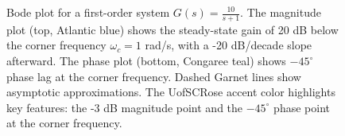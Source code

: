 \begin{figure}[htbp]

\caption{Bode plot for a first-order system $G(s) = \frac{10}{s+1}$. The magnitude plot (top, Atlantic blue) shows the steady-state gain of 20 dB below the corner frequency $\omega_c = 1$ rad/s, with a -20 dB/decade slope afterward. The phase plot (bottom, Congaree teal) shows $-45^{\circ}$ phase lag at the corner frequency. Dashed Garnet lines show asymptotic approximations. The UofSCRose accent color highlights key features: the -3 dB magnitude point and the $-45^{\circ}$ phase point at the corner frequency.}
\label{fig:bode_first_order}
\end{figure}
